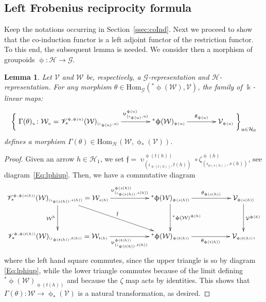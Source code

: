 \documentclass[pdftex]{sigma}
\numberwithin{equation}{section}
\newtheorem{Lemma}[Theorem]{Lemma}
\renewcommand{\hom}[3]{\mathrm{Hom}_{\Sscript{#1}}\left(#2, #3\right)}
\newcommand{\Ho}{\cH_{\Sscript{0}}}
\newcommand{\Ha}{\cH_{\Sscript{1}}}
\newcommand{\Wu}{\cW_{\Sscript{u}}}
\newcommand{\Wh}{\cW^{\Sscript{h}}}
\newcommand{\vV}{\mathscr{V}}
\newcommand{\cG}{{\mathcal G}}
\newcommand{\cH}{{\mathcal H}}
\newcommand{\cV}{{\mathcal V}}
\newcommand{\cW}{{\mathcal W}}
\newcommand{\Sscript}[1]{\scriptscriptstyle{#1}}
\newcommand{\pls}{{}^{*}\upphi}
\begin{document}
\subsection{Left Frobenius reciprocity formula}\label{ssec:LAdj}

Keep the notations occurring in Section~\ref{ssec:coInd}. Next we proceed to show that the co-induction functor is a left adjoint functor of the restriction functor. To this end, the subsequent lemma is needed. We consider then a morphism of groupoids $\upphi\colon \cH \to \cG$.
\begin{Lemma}\label{lema:Gamma} Let $\cV$ and $\cW$ be, respectively, a $\cG$-representation and $\cH$-representation. For any morphism $\theta \in \hom{\cG}{\pls(\cW)}{\cV}$, the family of $\Bbbk$-linear maps:
\begin{gather*}
\bigg\{ \xymatrix@C=40pt{ \Gamma(\theta)_{\Sscript{u}}\colon \Wu =
\vV^{\Sscript{\upphi,\upphi(u)}}_*(\cW)_{\Sscript{(\iota_{\upphi(u)}, u)}}
\ar@{->}^-{\upupsilon^{\Sscript{\upphi(u)}}_{\Sscript{(\iota_{\upphi(u)},
 u)}} }[r] & \pls(\cW)_{\Sscript{\upphi(u)}}
\ar@{->}^-{\theta_{\Sscript{\upphi(u)}}}[r] & \cV_{\Sscript{\upphi(u)}} }\bigg\}_{u \in \Ho}
\end{gather*}
defines a morphism $\Gamma(\theta) \in \hom{\cH}{\cW}{\upphi_{*}(\cV)}$.
\end{Lemma}
\begin{proof}Given an arrow $h \in \Ha$, we set $\mathfrak{f}=\upupsilon^{\Sscript{\upphi(t(h))}}_{\Sscript{(\iota_{\upphi(t(h))},t(h))}} \circ\zeta^{\Sscript{\upphi(h)}}_{\Sscript{(\iota_{\phi(s(h))},s(h))}}$, see diagram~\eqref{Eq:lphiup}. Then, we have a commutative diagram
\begin{gather*}
\xymatrix@R=35pt{\vV^{\Sscript{\upphi,
\upphi(s(h))}}_*(\cW)_{\Sscript{(\iota_{\upphi(s(h))},s(h))}} =\cW_{\Sscript{s(h)}}
\ar@{->}^-{\upupsilon^{\Sscript{\upphi(s(h))}}_{\Sscript{(\iota_{\upphi(s(h))},s(h))}}}[rr] \ar@{->}_-{\Wh}[d] \ar@{->}^-{\mathfrak{f}}[drr] &
& \pls(\cW)_{\Sscript{\upphi(s(h))}}\ar@{->}^-{\theta_{\Sscript{\upphi(s(h))}}}[rr]\ar@{->}^-{\pls(\cW)^{\upphi(h)}}[d] & & \cV_
{\Sscript{\upphi(s(h))}} \ar@{->}^-{\cV^{\Sscript{\upphi(h)}}}[d]
\\ \vV^{\Sscript{\upphi, \upphi(t(h))}}_*(\cW)_{\Sscript{(\iota_{\upphi(t(h))}, t(h))}}=\cW_{\Sscript{t(h)}}
\ar@{->}_-{\upupsilon^{\Sscript{\upphi(t(h))}}_{\Sscript{(\iota_{\upphi(t(h))},t(h))}}}[rr] & & \pls(\cW)_{\Sscript{\upphi(t(h))}}\ar@{->}_-{\theta_{\Sscript{\upphi(t(h))}}}[rr] & & \cV_
{\Sscript{\upphi(t(h))}}, }
\end{gather*}
where the left hand square commutes, since the upper triangle is so by diagram \eqref{Eq:lphiup}, while the lower triangle commutes because of the limit defining $\pls(\cW)_{\Sscript{\upphi(t(h))}}$ and because the $\zeta$ map acts by identities. This shows that $\Gamma(\theta)\colon \cW \to \upphi_{*}(\cV)$ is a natural transformation, as desired.
\end{proof}
\end{document}
